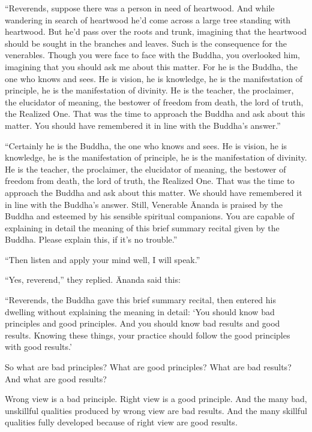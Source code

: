 \documentclass[12pt,openany]{book}%
\begin{document}
“Reverends, suppose there was a person in need of heartwood. And while wandering in search of heartwood he’d come across a large tree standing with heartwood. But he’d pass over the roots and trunk, imagining that the heartwood should be sought in the branches and leaves. Such is the consequence for the venerables. Though you were face to face with the Buddha, you overlooked him, imagining that you should ask me about this matter. For he is the Buddha, the one who knows and sees. He is vision, he is knowledge, he is the manifestation of principle, he is the manifestation of divinity. He is the teacher, the proclaimer, the elucidator of meaning, the bestower of freedom from death, the lord of truth, the Realized One. That was the time to approach the Buddha and ask about this matter. You should have remembered it in line with the Buddha’s answer.” 

“Certainly he is the Buddha, the one who knows and sees. He is vision, he is knowledge, he is the manifestation of principle, he is the manifestation of divinity. He is the teacher, the proclaimer, the elucidator of meaning, the bestower of freedom from death, the lord of truth, the Realized One. That was the time to approach the Buddha and ask about this matter. We should have remembered it in line with the Buddha’s answer. Still, Venerable Ānanda is praised by the Buddha and esteemed by his sensible spiritual companions. You are capable of explaining in detail the meaning of this brief summary recital given by the Buddha. Please explain this, if it’s no trouble.” 

“Then listen and apply your mind well, I will speak.” 

“Yes, reverend,” they replied. Ānanda said this: 

“Reverends, the Buddha gave this brief summary recital, then entered his dwelling without explaining the meaning in detail: ‘You should know bad principles and good principles. And you should know bad results and good results. Knowing these things, your practice should follow the good principles with good results.’ 

So what are bad principles? What are good principles? What are bad results? And what are good results? 

Wrong view is a bad principle. Right view is a good principle. And the many bad, unskillful qualities produced by wrong view are bad results. And the many skillful qualities fully developed because of right view are good results. 
\end{document}
